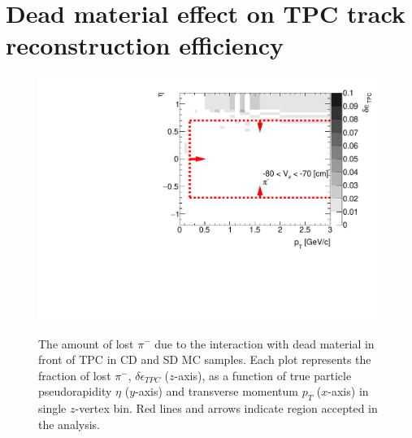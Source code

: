 
\chapter{Dead material effect on TPC track reconstruction efficiency}\label{appendix:deadMaterial}
\begin{figure}[hb]
	\caption[The amount of lost $\pi^-$ due to the interaction with dead material in front of TPC as a function of $p_T$, $\eta$ and $z$-vertex in CD and SD]{The amount of lost $\pi^-$ due to the interaction with dead material in front of TPC in CD and SD MC samples. Each plot represents the fraction of lost $\pi^-$, $\delta\epsilon_{ TPC}$ ($z$-axis), as a function of true particle pseudorapidity $\eta$ ($y$-axis) and transverse momentum $p_{T}$ ($x$-axis) in single $z$-vertex bin. Red lines and arrows indicate region accepted in the analysis.}\label{fig:dead_materialSDCD3Dpim}
	\centering
	\parbox{0.325\textwidth}{
		\centering
		\includegraphics[width=\linewidth,page=1]{graphics/systematicsEfficiency/deadMaterial/secondaries_Unbinned_SDCD_.pdf}\\
}
\end{figure}
